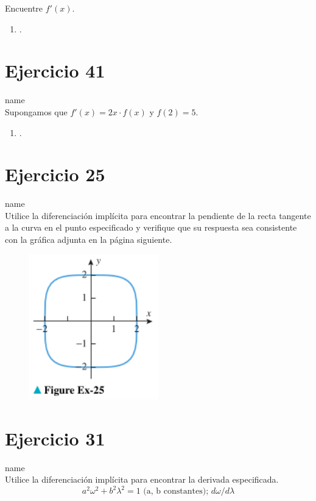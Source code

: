 \documentclass[12pt]{article}
\begin{document}
Encuentre $f'(x)$.
\begin{enumerate}[label=(\alph*)]
\item .
\end{enumerate}

\section{Ejercicio 41} name \\

Supongamos que $f'(x) = 2x \cdot f(x)$ y $f(2) = 5$.
\begin{enumerate}[label=(\alph*)]
\item .
\end{enumerate}

\section{Ejercicio 25} name \\

Utilice la diferenciación implícita para encontrar la pendiente de la recta tangente a la curva en el punto especificado y verifique que su respuesta sea consistente con la gráfica adjunta en la página siguiente.
\begin{figure}[h!]
\centering
\includegraphics[width=0.5\textwidth]{../img/img_Lista2/3_25.png}
\end{figure}

\section{Ejercicio 31} name \\

Utilice la diferenciación implícita para encontrar la derivada especificada.
\[ a^2 \omega^2 + b^2 \lambda^2 = 1 \text{ (a, b constantes); } d\omega /d\lambda \]
\end{document}
